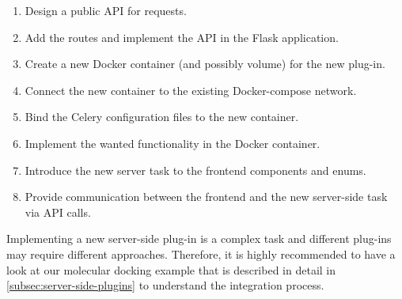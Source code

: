 \begin{enumerate}
    \item Design a public API for requests.
    \item Add the routes and implement the API in the Flask application.
    \item Create a new Docker container (and possibly volume) for the new plug-in.
    \item Connect the new container to the existing Docker-compose network.
    \item Bind the Celery configuration files to the new container.
    \item Implement the wanted functionality in the Docker container.
    \item Introduce the new server task to the frontend components and enums.
    \item Provide communication between the frontend and the new server-side task via API calls.
\end{enumerate}

Implementing a new server-side plug-in is a complex task and different plug-ins may require different approaches. Therefore, it is highly recommended to have a look at our molecular docking example that is described in detail in \cref{subsec:server-side-plugins} to understand the integration process.
